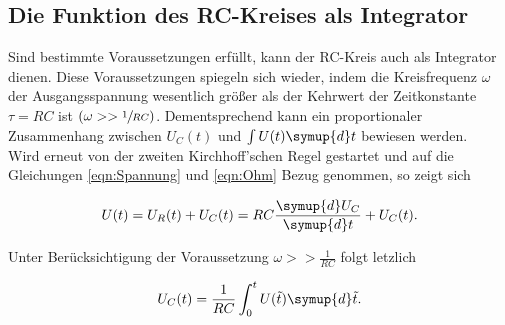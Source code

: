 \subsection{Die Funktion des RC-Kreises als Integrator}

Sind bestimmte Voraussetzungen erfüllt, kann der RC-Kreis auch als Integrator dienen. Diese Voraussetzungen spiegeln sich wieder,
indem die Kreisfrequenz $\omega$ der Ausgangsspannung wesentlich größer als der Kehrwert der Zeitkonstante $\tau = RC$ ist $(\omega >> \sfrac{1}{RC})$.
Dementsprechend kann ein proportionaler Zusammenhang zwischen $U_C(t)$ und $\int U(t)\symup{d}t$ bewiesen werden.\\
Wird erneut von der zweiten Kirchhoff'schen Regel gestartet und auf die Gleichungen \eqref{eqn:Spannung} und \eqref{eqn:Ohm} Bezug genommen, so zeigt sich

\begin{equation}
    U(t) = U_R(t) + U_C(t) = RC\frac{\symup{d}U_C}{\symup{d}t} + U_C(t).
\end{equation}

\noindent Unter Berücksichtigung der Voraussetzung $\omega >> \frac{1}{RC}$ folgt letzlich

\begin{equation}
    U_C(t) = \frac{1}{RC}\int_0^t U(\tilde{t})\symup{d}\tilde{t}.
\end{equation}


%